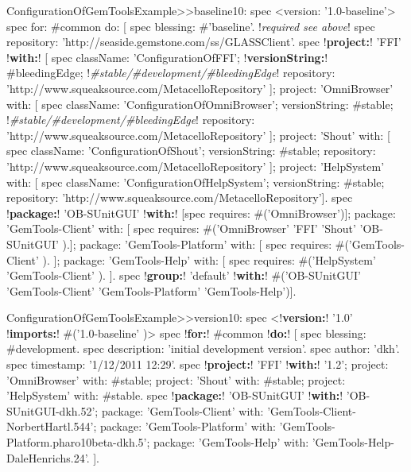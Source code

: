 \documentclass[a4paper,10pt,twoside]{book}
\begin{document}
\begin{footnotesize}
\begin{code}{}
ConfigurationOfGemToolsExample>>baseline10: spec
  <version: '1.0-baseline'>
  spec for: #common do: [
     spec blessing: #'baseline'.                 !\emph{required see above}!
     spec repository: 'http://seaside.gemstone.com/ss/GLASSClient'.
     spec
        !\textbf{project:}! 'FFI' !\textbf{with:}! [
          spec
             className: 'ConfigurationOfFFI';
             !\textbf{versionString:}! #bleedingEdge;					!\emph{\#stable/\#development/\#bleedingEdge}!
             repository: 'http://www.squeaksource.com/MetacelloRepository' ];
        project: 'OmniBrowser' with: [
          spec
             className: 'ConfigurationOfOmniBrowser';
             versionString: #stable;									!\emph{\#stable/\#development/\#bleedingEdge}!
             repository: 'http://www.squeaksource.com/MetacelloRepository' ];
        project: 'Shout' with: [
          spec
             className: 'ConfigurationOfShout';
             versionString: #stable;
             repository: 'http://www.squeaksource.com/MetacelloRepository' ];
        project: 'HelpSystem' with: [
          spec
             className: 'ConfigurationOfHelpSystem';
             versionString: #stable;
             repository: 'http://www.squeaksource.com/MetacelloRepository'].
     spec
        !\textbf{package:}! 'OB-SUnitGUI' !\textbf{with:}! [spec requires: #('OmniBrowser')];
        package: 'GemTools-Client' with: [ spec requires: #('OmniBrowser' 'FFI' 'Shout' 'OB-SUnitGUI' ).];
        package: 'GemTools-Platform' with: [ spec requires: #('GemTools-Client' ). ];
        package: 'GemTools-Help' with: [
          spec requires: #('HelpSystem' 'GemTools-Client' ). ].
     spec !\textbf{group:}! 'default' !\textbf{with:}! #('OB-SUnitGUI' 'GemTools-Client' 'GemTools-Platform' 'GemTools-Help')].
\end{code}         
\end{footnotesize} 







\begin{footnotesize}
\begin{code}{}
ConfigurationOfGemToolsExample>>version10: spec
     <!\textbf{version:}! '1.0' !\textbf{imports:}! #('1.0-baseline' )>
     spec !\textbf{for:}! #common !\textbf{do:}! [
          spec blessing: #development.
          spec description: 'initial development version'.
          spec author: 'dkh'.
          spec timestamp: '1/12/2011 12:29'.
     spec 
          !\textbf{project:}! 'FFI' !\textbf{with:}! '1.2';
          project: 'OmniBrowser' with: #stable;
          project: 'Shout' with: #stable;
          project: 'HelpSystem' with: #stable.
     spec
          !\textbf{package:}! 'OB-SUnitGUI' !\textbf{with:}! 'OB-SUnitGUI-dkh.52';
          package: 'GemTools-Client' with: 'GemTools-Client-NorbertHartl.544';
          package: 'GemTools-Platform' with: 'GemTools-Platform.pharo10beta-dkh.5';
          package: 'GemTools-Help' with: 'GemTools-Help-DaleHenrichs.24'. ].
\end{code}
\end{footnotesize} 
\end{document}
